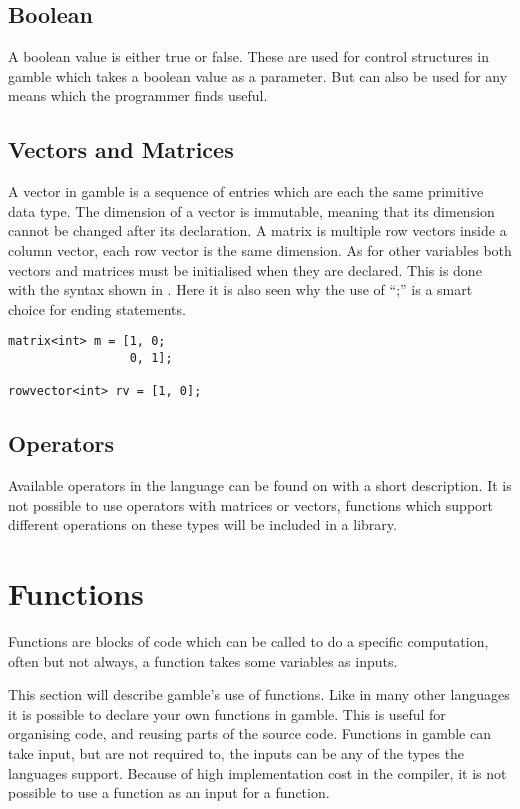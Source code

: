 \subsection*{Boolean}
A boolean value is either true or false. 
These are used for control structures in \gls{gamble} which takes a boolean value as a parameter. 
But can also be used for any means which the programmer finds useful. 

\subsection*{Vectors and Matrices}
A vector in \gls{gamble} is a sequence of entries which are each the same primitive data type. 
The dimension of a vector is immutable, meaning that its dimension cannot be changed after its declaration. 
A matrix is multiple row vectors inside a column vector, each row vector is the same dimension. 
As for other variables both vectors and matrices must be initialised when they are declared. 
This is done with the syntax shown in .
Here it is also seen why the use of ``;'' is a smart choice for ending statements.

\begin{lstlisting}[caption={Creating a matrix},label={lst:matrix},numbers=none]
matrix<int> m = [1, 0; 
                 0, 1];

rowvector<int> rv = [1, 0];
\end{lstlisting}

\subsection*{Operators}
Available operators in the language can be found on  with a short description.  
It is not possible to use operators with matrices or vectors, functions which support different operations on these types will be included in a library.


\section{Functions}
Functions are blocks of code which can be called to do a specific computation, often but not always, a function takes some variables as inputs.

This section will describe \gls{gamble}'s use of functions. 
Like in many other languages it is possible to declare your own functions in \gls{gamble}.
This is useful for organising code, and reusing parts of the source code.
Functions in \gls{gamble} can take input, but are not required to, the inputs can be any of the types the languages support.
Because of high implementation cost in the compiler, it is not possible to use a function as an input for a function.



